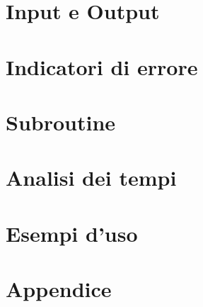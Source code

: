 \documentclass[a4paper,11pt]{book}
\begin{document}
\chapter{Input e Output}
\chapter{Indicatori di errore}
\chapter{Subroutine}
\chapter{Analisi dei tempi}
\chapter{Esempi d'uso}
\chapter{Appendice}
\end{document}
